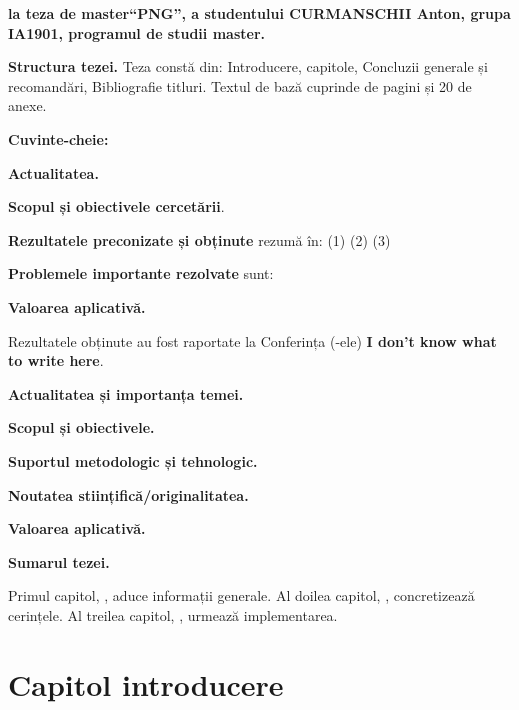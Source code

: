 \documentclass[a4paper,12pt]{report}
\newcommand{\authorName}{CURMANSCHII Anton}
\newcommand{\thesisTitle}{PNG}
\newcommand{\uniGroupName}{IA1901}
\newcommand{\thesisType}{master}
\newcommand{\programulDeStudii}{master}
\newcommand{\anexeCount}{20}
\newcommand{\conferencesList}{I don't know what to write here}
\begin{document}


\clearpage
\tableofcontents

\clearpage
{}
\begin{acronym}
\end{acronym}


\clearpage
{}

\textbf{la teza de \thesisType ``\thesisTitle'', a studentului \authorName{}, grupa \uniGroupName{}, programul de studii \programulDeStudii.}

\textbf{Structura tezei.}
Teza constă din: Introducere,  capitole, Concluzii generale și recomandări, Bibliografie \bibliographyEntryCount{} titluri.
Textul de bază cuprinde \usefulPageCount{} de pagini și \anexeCount{} de anexe.

\textbf{Cuvinte-cheie:}

\textbf{Actualitatea.}

\textbf{Scopul și obiectivele cercetării}.

\textbf{Rezultatele preconizate și obținute} rezumă în: (1) (2) (3)

\textbf{Problemele importante rezolvate} sunt:

\textbf{Valoarea aplicativă.}

Rezultatele obținute au fost raportate la Conferința (-ele) \textbf{\conferencesList}.



\textbf{Actualitatea și importanța temei.}

\textbf{Scopul și obiectivele.}

\textbf{Suportul metodologic și tehnologic.}

\textbf{Noutatea stiințifică/originalitatea.}

\textbf{Valoarea aplicativă.}

\textbf{Sumarul tezei.}

Primul capitol, , aduce informații generale.
Al doilea capitol, , concretizează cerințele.
Al treilea capitol, , urmează implementarea.


\chapter{Capitol introducere}\label{intro_chapter_title}
\end{document}
